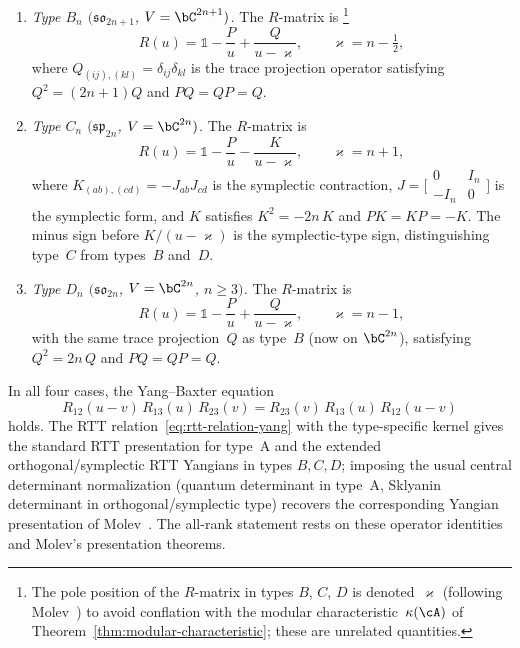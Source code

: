 \begin{theorem}
\begin{enumerate}[label=\textup{(\roman*)}]
\item \emph{Type $B_n$ $(\mathfrak{so}_{2n+1}$, $V = \bC^{2n+1})$.}
 The $R$-matrix is%
 \footnote{The pole position of the $R$-matrix in types $B$, $C$, $D$
 is denoted~$\varkappa$ (following Molev~\cite{molev-yangians}) to
 avoid conflation with the modular characteristic~$\kappa(\cA)$
 of Theorem~\textup{\ref{thm:modular-characteristic}};
 these are unrelated quantities.}
 \begin{equation}\label{eq:rmatrix-type-b}
 R(u) = \mathbb{1} - \frac{P}{u} + \frac{Q}{u - \varkappa},
 \qquad \varkappa = n - \tfrac{1}{2},
 \end{equation}
 where $Q_{(ij),(kl)} = \delta_{ij}\delta_{kl}$ is the trace
 projection operator satisfying $Q^2 = (2n{+}1) Q$ and $PQ = QP = Q$.

\item \emph{Type $C_n$ $(\mathfrak{sp}_{2n}$, $V = \bC^{2n})$.}
 The $R$-matrix is
 \begin{equation}\label{eq:rmatrix-type-c}
 R(u) = \mathbb{1} - \frac{P}{u} - \frac{K}{u - \varkappa},
 \qquad \varkappa = n + 1,
 \end{equation}
 where $K_{(ab),(cd)} = -J_{ab}J_{cd}$ is the symplectic contraction,
 $J = \bigl[\begin{smallmatrix} 0 & I_n \\ -I_n & 0 \end{smallmatrix}\bigr]$
 is the symplectic form, and $K$ satisfies $K^2 = -2n\,K$ and
 $PK = KP = -K$. The minus sign before $K/(u - \varkappa)$ is the
 symplectic-type sign, distinguishing type~$C$ from types~$B$ and~$D$.

\item \emph{Type $D_n$ $(\mathfrak{so}_{2n}$, $V = \bC^{2n}$,
 $n \geq 3)$.}
 The $R$-matrix is
 \begin{equation}\label{eq:rmatrix-type-d}
 R(u) = \mathbb{1} - \frac{P}{u} + \frac{Q}{u - \varkappa},
 \qquad \varkappa = n - 1,
 \end{equation}
 with the same trace projection~$Q$ as type~$B$ (now on $\bC^{2n}$),
 satisfying $Q^2 = 2n\, Q$ and $PQ = QP = Q$.
\end{enumerate}
In all four cases, the Yang--Baxter equation
\begin{equation}\label{eq:ybe-all-types}
R_{12}(u{-}v)\, R_{13}(u)\, R_{23}(v)
= R_{23}(v)\, R_{13}(u)\, R_{12}(u{-}v)
\end{equation}
holds.  The RTT relation~\eqref{eq:rtt-relation-yang} with the
type-specific kernel gives the standard RTT presentation for type~A
and the extended orthogonal/symplectic RTT Yangians in types
$B,C,D$; imposing the usual central determinant normalization
(quantum determinant in type~A, Sklyanin determinant in
orthogonal/symplectic type) recovers the corresponding Yangian
presentation of Molev~\cite[Theorems 3.2.1, 4.2.1, 4.3.1,
4.4.1]{molev-yangians}.  The all-rank statement rests on these
operator identities and Molev's presentation theorems.
\end{theorem}

